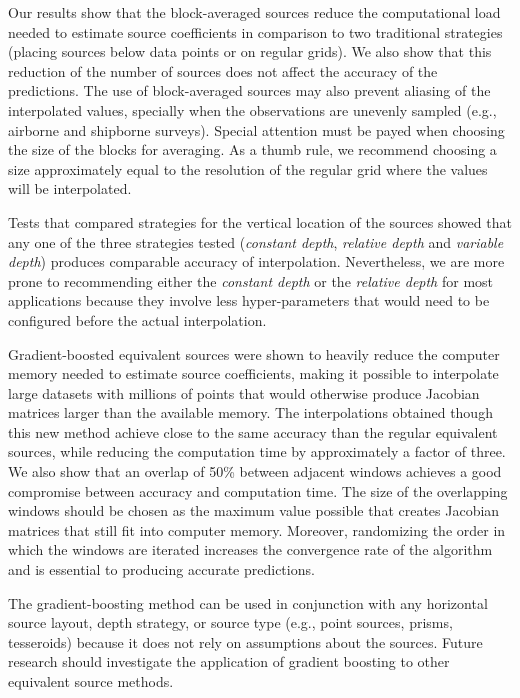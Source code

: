 Our results show that the block-averaged sources reduce the computational
load needed to estimate source coefficients in comparison to two traditional
strategies (placing sources below data points or on regular grids).
We also show that this reduction of the number of sources does not affect
the accuracy of the predictions.
The use of block-averaged sources may also prevent aliasing of the interpolated
values, specially when the observations are unevenly sampled (e.g., airborne
and shipborne surveys).
Special attention must be payed when choosing the size of the blocks for
averaging.
As a thumb rule, we recommend choosing a size approximately equal to
the resolution of the regular grid where the values will be interpolated.

Tests that compared strategies for the vertical location of the
sources showed that any one of the three strategies tested
(\emph{constant depth}, \emph{relative depth} and \emph{variable depth})
produces comparable accuracy of interpolation.
Nevertheless, we are more prone to recommending either the \emph{constant
depth} or the \emph{relative depth} for most applications because they involve
less hyper-parameters that would need to be configured before the actual
interpolation.

Gradient-boosted equivalent sources were shown to heavily reduce the computer
memory needed to estimate source coefficients, making it possible to
interpolate large datasets with millions of points that would otherwise produce
Jacobian matrices larger than the available memory.
The interpolations obtained though this new method achieve close to the same
accuracy than the regular equivalent sources, while reducing the computation
time by approximately a factor of three.
We also show that an overlap of 50\% between adjacent windows achieves a good
compromise between accuracy and computation time.
The size of the overlapping windows should be chosen as the maximum value
possible that creates Jacobian matrices that still fit into computer memory.
Moreover, randomizing the order in which the windows are iterated increases the
convergence rate of the algorithm and is essential to producing accurate
predictions.

The gradient-boosting method can be used in conjunction with any horizontal
source layout, depth strategy, or source type (e.g., point sources, prisms,
tesseroids) because it does not rely on assumptions about the sources.
Future research should investigate the application of gradient boosting to
other equivalent source methods.

